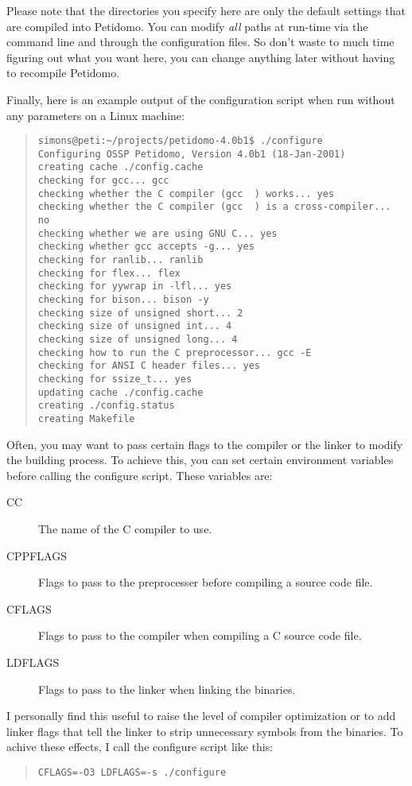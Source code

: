 \documentclass[a4paper,10pt]{scrreprt}
\begin{document}
Please note that the directories you specify here are only the default
settings that are compiled into Petidomo. You can modify \emph{all}
paths at run-time via the command line and through the configuration
files. So don't waste to much time figuring out what you want here,
you can change anything later without having to recompile Petidomo.

Finally, here is an example output of the configuration script when
run without any parameters on a Linux machine:
\begin{quote}
\begin{verbatim}
simons@peti:~/projects/petidomo-4.0b1$ ./configure
Configuring OSSP Petidomo, Version 4.0b1 (18-Jan-2001)
creating cache ./config.cache
checking for gcc... gcc
checking whether the C compiler (gcc  ) works... yes
checking whether the C compiler (gcc  ) is a cross-compiler... no
checking whether we are using GNU C... yes
checking whether gcc accepts -g... yes
checking for ranlib... ranlib
checking for flex... flex
checking for yywrap in -lfl... yes
checking for bison... bison -y
checking size of unsigned short... 2
checking size of unsigned int... 4
checking size of unsigned long... 4
checking how to run the C preprocessor... gcc -E
checking for ANSI C header files... yes
checking for ssize_t... yes
updating cache ./config.cache
creating ./config.status
creating Makefile
\end{verbatim}
\end{quote}

Often, you may want to pass certain flags to the compiler or the
linker to modify the building process. To achieve this, you can set
certain environment variables before calling the configure script.
These variables are:
\begin{description}
\item[CC] The name of the C compiler to use.

\item[CPPFLAGS] Flags to pass to the preprocesser before compiling a
source code file.

\item[CFLAGS] Flags to pass to the compiler when compiling a C source
code file.

\item[LDFLAGS] Flags to pass to the linker when linking the binaries.

\end{description}

I personally find this useful to raise the level of compiler
optimization or to add linker flags that tell the linker to strip
unnecessary symbols from the binaries. To achive these effects, I call
the configure script like this:
\begin{quote}
\begin{verbatim}
CFLAGS=-O3 LDFLAGS=-s ./configure
\end{verbatim}
\end{quote}
\end{document}
